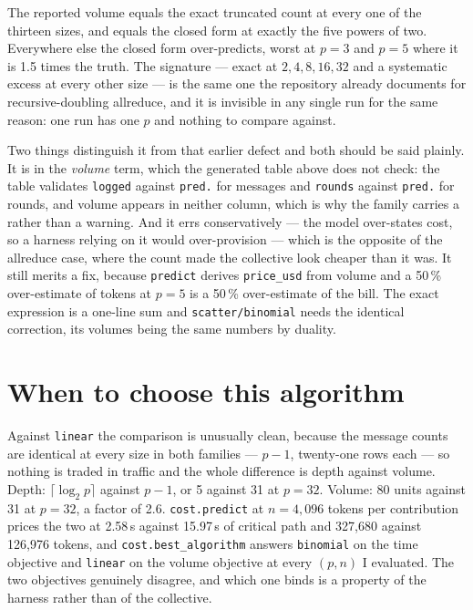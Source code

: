 \documentclass[11pt]{article}
\begin{document}
The reported volume equals the exact truncated count at every one of the thirteen sizes, and
equals the closed form at exactly the five powers of two. Everywhere else the closed form
over-predicts, worst at $p=3$ and $p=5$ where it is 1.5 times the truth. The signature --- exact
at $2, 4, 8, 16, 32$ and a systematic excess at every other size --- is the same one the
repository already documents for recursive-doubling allreduce, and it is invisible in any single
run for the same reason: one run has one $p$ and nothing to compare against.

Two things distinguish it from that earlier defect and both should be said plainly. It is in the
\emph{volume} term, which the generated table above does not check: the table validates
\texttt{logged} against \texttt{pred.} for messages and \texttt{rounds} against \texttt{pred.}
for rounds, and volume appears in neither column, which is why the family carries a
 rather than a warning. And it errs conservatively --- the model over-states cost, so
a harness relying on it would over-provision --- which is the opposite of the allreduce case,
where the count made the collective look cheaper than it was. It still merits a fix, because
\texttt{predict} derives \texttt{price\_usd} from volume and a 50\,\% over-estimate of tokens at
$p=5$ is a 50\,\% over-estimate of the bill. The exact expression is a one-line sum and
\texttt{scatter/binomial} needs the identical correction, its volumes being the same numbers by
duality.

\section{When to choose this algorithm}

Against \texttt{linear} the comparison is unusually clean, because the message counts are
identical at every size in both families --- $p-1$, twenty-one rows each --- so nothing is traded
in traffic and the whole difference is depth against volume. Depth: $\lceil\log_2 p\rceil$ against
$p-1$, or 5 against 31 at $p=32$. Volume: 80 units against 31 at $p=32$, a factor of 2.6.
\texttt{cost.predict} at $n = 4{,}096$ tokens per contribution prices the two at 2.58\,s against
15.97\,s of critical path and 327,680 against 126,976 tokens, and
\texttt{cost.best\_algorithm} answers \texttt{binomial} on the time objective and
\texttt{linear} on the volume objective at every $(p, n)$ I evaluated. The two objectives
genuinely disagree, and which one binds is a property of the harness rather than of the
collective.
\end{document}
